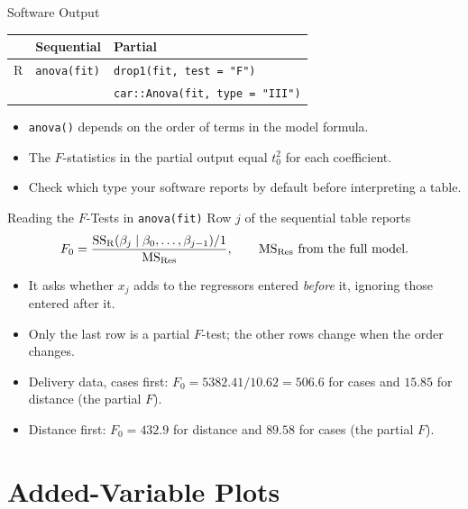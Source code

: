 \begin{frame}{Software Output}
    \begin{center}
        \small
        \begin{tabular}{lll}
            \toprule
            & Sequential & Partial \\
            \midrule
            R & \texttt{anova(fit)} & \texttt{drop1(fit, test = "F")} \\
            & & \texttt{car::Anova(fit, type = "III")} \\
            \bottomrule
        \end{tabular}
    \end{center}
    \begin{itemize}
        \item \texttt{anova()} depends on the order of terms in the model formula.
        \item The $F$-statistics in the partial output equal $t_0^2$ for each coefficient.
        \item Check which type your software reports by default before interpreting a table.
    \end{itemize}
\end{frame}


\begin{frame}{Reading the $F$-Tests in \texttt{anova(fit)}}
    Row $j$ of the sequential table reports
    \[
    F_0 = \frac{\mathrm{SS}_{\mathrm{R}}(\beta_j\mid\beta_0,\dots,\beta_{j-1})/1}{\mathrm{MS}_{\mathrm{Res}}},
    \qquad \mathrm{MS}_{\mathrm{Res}} \text{ from the full model.}
    \]
    \begin{itemize}
        \item It asks whether $x_j$ adds to the regressors entered \emph{before} it, ignoring those entered after it.
        \item Only the last row is a partial $F$-test; the other rows change when the order changes.
        \item Delivery data, cases first: $F_0=5382.41/10.62=506.6$ for cases and $15.85$ for distance (the partial $F$).
        \item Distance first: $F_0=432.9$ for distance and $89.58$ for cases (the partial $F$).
    \end{itemize}
\end{frame}


\section{Added-Variable Plots}


